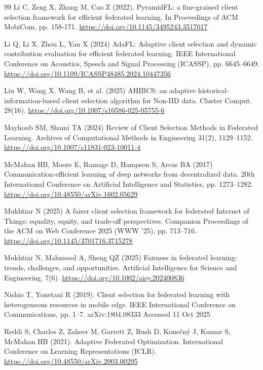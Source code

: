 \documentclass[pdflatex,sn-mathphys-num,oneside]{sn-jnl}%
\theoremstyle{thmstyleone}%
\theoremstyle{thmstyletwo}%
\theoremstyle{thmstylethree}%
\begin{document}
\begin{thebibliography}{99}
Li C, Zeng X, Zhang M, Cao Z (2022). PyramidFL: a fine-grained client selection framework for efficient federated learning. In Proceedings of ACM MobiCom, pp. 158-171. \url{https://doi.org/10.1145/3495243.3517017}

Li Q, Li X, Zhou L, Yan X (2024) AdaFL: Adaptive client selection and dynamic contribution evaluation for efficient federated learning. IEEE International Conference on Acoustics, Speech and Signal Processing (ICASSP), pp. 6645–6649. \url{https://doi.org/10.1109/ICASSP48485.2024.10447356}

Liu W, Wang X, Wang B, et al. (2025) AHIBCS: an adaptive historical-information-based client selection algorithm for Non-IID data. Cluster Comput. 28(16). \url{https://doi.org/10.1007/s10586-025-05755-6}

Mayhoub SM, Shami TA (2024) Review of Client Selection Methods in Federated Learning. Archives of Computational Methods in Engineering 31(2), 1129–1152. \url{https://doi.org/10.1007/s11831-023-10011-4}

McMahan HB, Moore E, Ramage D, Hampson S, Arcas BA (2017) Communication-efficient learning of deep networks from decentralized data. 20th International Conference on Artificial Intelligence and Statistics, pp. 1273–1282. \url{https://doi.org/10.48550/arXiv.1602.05629}

Mukhtiar N (2025) A fairer client selection framework for federated Internet of Things: equality, equity, and trade-off perspectives. Companion Proceedings of the ACM on Web Conference 2025 (WWW ’25), pp. 713–716. \url{https://doi.org/10.1145/3701716.3715278}

Mukhtiar N, Mahmood A, Sheng QZ (2025) Fairness in federated learning: trends, challenges, and opportunities. Artificial Intelligence for Science and Engineering, 7(6). \url{https://doi.org/10.1002/aisy.202400836}

Nishio T, Yonetani R (2019). Client selection for federated learning with heterogeneous resources in mobile edge. IEEE International Conference on Communications, pp. 1–7. arXiv:1804.08333 Accessed 11 Oct 2025

Reddi S, Charles Z, Zaheer M, Garrett Z, Rush D, Konečný J, Kumar S, McMahan HB (2021). Adaptive Federated Optimization. International Conference on Learning Representations (ICLR). \url{https://doi.org/10.48550/arXiv.2003.00295}


\end{thebibliography}
\end{document}
